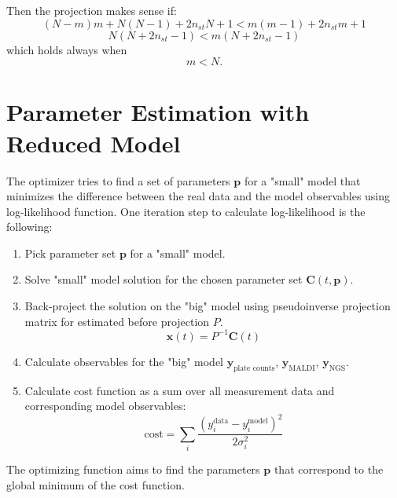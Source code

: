 \documentclass[10pt,A4paper]{article}
\begin{document}
Then the projection makes sense if:
\begin{equation}
    (N-m)m + N(N-1) + 2 n_{st} N + 1 < m(m-1) + 2 n_{st} m + 1
\end{equation}
\begin{equation}
    N(N + 2 n_{st} - 1) < m(N + 2 n_{st} - 1)
\end{equation}
which holds always when 
\begin{equation}
    m < N.
\end{equation}

\section{Parameter Estimation with Reduced Model}
 
The optimizer tries to find a set of parameters $\mathbf{p}$ for a "small" model that minimizes the difference between the real data and the model observables using log-likelihood function.
One iteration step to calculate log-likelihood is the following:
\begin{enumerate}
    \item Pick parameter set $\mathbf{p}$ for a "small" model.
    \item Solve "small" model solution for the chosen parameter set $\mathbf{C}(t, \mathbf{p})$.
    \item Back-project the solution on the "big" model using pseudoinverse projection matrix for estimated before projection $P$.
    \begin{equation}
        \mathbf{x} (t) = P^{-1} \mathbf{C} (t)
    \end{equation}
    \item Calculate observables for the "big" model $\mathbf{y}_\text{plate counts}$,  $\mathbf{y}_\text{MALDI}$,  $\mathbf{y}_\text{NGS}$.
    \item Calculate cost function as a sum over all measurement data and corresponding model observables:
    \begin{equation}
        \text{cost} = \sum_i \frac{(y_i^\text{data} - y_i^\text{model})^2}{2 \sigma_i^2}
    \end{equation}
\end{enumerate}
The optimizing function aims to find the parameters $\mathbf{p}$ that correspond to the global minimum of the cost function.
\end{document}

